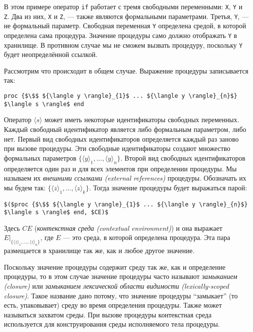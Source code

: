 В этом примере оператор \lstinline|if| работает с тремя свободными переменными: \lstinline|X|, \lstinline|Y| и \lstinline|Z|. Два из них, \lstinline|X| и \lstinline|Z|, --- также являются формальными параметрами. Третья, \lstinline|Y|, --- не формальный параметр. Свободная переменная \lstinline|Y| определена средой, в которой определена сама процедура. Значение процедуры само должно отображать \lstinline|Y| в хранилище. В противном случае мы не сможем вызвать процедуру, поскольку \lstinline|Y| будет неопределённой ссылкой.

Рассмотрим что происходит в общем случае. Выражение процедуры записывается так:

\begin{lstlisting}
proc {$\$$ ${\langle y \rangle}_{1}$ ... ${\langle y \rangle}_{n}$} $\langle s \rangle$ end
\end{lstlisting}

Оператор $\langle s \rangle$ может иметь некоторые идентификаторы свободных переменных. Каждый свободный идентификатор является либо формальным параметром, либо нет. Первый вид свободных идентификаторов определяется каждый раз заново при вызове процедуры. Эти свободные идентификаторы создают множество формальных параметров $\{ {\langle y \rangle}_{1}, ..., {\langle y \rangle}_{n}\}$. Второй вид свободных идентификаторов определяется один раз и для всех элементов при определении процедуры. Мы называем их \emph{внешними ссылками (external references)} процедуры. Обозначать их мы будем так: $\{ {\langle z \rangle}_{1}, ..., {\langle z \rangle}_{k}\}$. Тогда значение процедуры будет выражаться парой:

\begin{lstlisting}
$($proc {$\$$ ${\langle y \rangle}_{1}$ ... ${\langle y \rangle}_{n}$} $\langle s \rangle$ end, $CE)$
\end{lstlisting}

Здесь $CE$ (\emph{контекстная среда (contextual environment)}) и она выражает $E|_{\{ {\langle z \rangle}_{1}, ..., {\langle z \rangle}_{n}\}}$, где $E$ --- это среда, в которой определена процедура. Эта пара размещается в хранилище так же, как и любое другое значение.

Поскольку значение процедуры содержит среду так же, как и определение процедуры, то в этом случае значение процедуры часто называют \emph{замыканием (closure)} или \emph{замыканием лексической области видимости (lexically-scoped closure)}. Такое название дано потому, что значение процедуры ``замыкает'' (то есть, упаковывает) среду во время определения процедуры. Также может называться захватом среды. При вызове процедуры контекстная среда используется для конструирования среды исполняемого тела процедуры.


